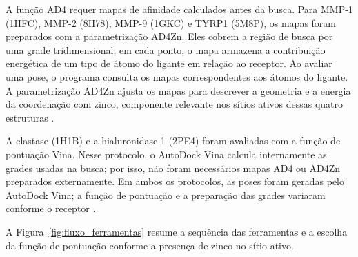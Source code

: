 A função AD4 requer mapas de afinidade calculados antes da busca. Para MMP-1 (1HFC), MMP-2 (8H78), MMP-9 (1GKC) e TYRP1 (5M8P), os mapas foram preparados com a parametrização AD4Zn. Eles cobrem a região de busca por uma grade tridimensional; em cada ponto, o mapa armazena a contribuição energética de um tipo de átomo do ligante em relação ao receptor. Ao avaliar uma pose, o programa consulta os mapas correspondentes aos átomos do ligante. A parametrização AD4Zn ajusta os mapas para descrever a geometria e a energia da coordenação com zinco, componente relevante nos sítios ativos dessas quatro estruturas \parencite{morris2009autodock,santos2014zn}.

A elastase (1H1B) e a hialuronidase 1 (2PE4) foram avaliadas com a função de pontuação Vina. Nesse protocolo, o AutoDock Vina calcula internamente as grades usadas na busca; por isso, não foram necessários mapas AD4 ou AD4Zn preparados externamente. Em ambos os protocolos, as poses foram geradas pelo AutoDock Vina; a função de pontuação e a preparação das grades variaram conforme o receptor \parencite{eberhardt2021vina}.

A Figura~\ref{fig:fluxo_ferramentas} resume a sequência das ferramentas e a escolha da função de pontuação conforme a presença de zinco no sítio ativo.

